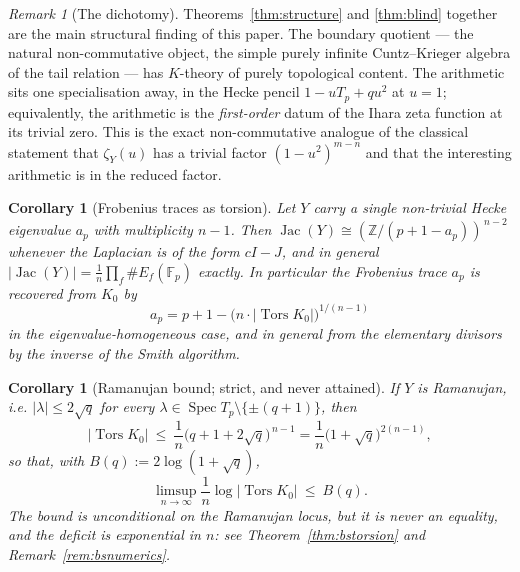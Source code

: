 \documentclass[11pt]{amsart}
\numberwithin{equation}{section}
\newtheorem{corollary}[theorem]{Corollary}
\theoremstyle{definition}
\theoremstyle{remark}
\newtheorem{remark}[theorem]{Remark}
\newcommand{\Z}{\mathbb{Z}}
\newcommand{\F}{\mathbb{F}}
\newcommand{\Tors}{\operatorname{Tors}}
\newcommand{\Jac}{\operatorname{Jac}}
\newcommand{\Spec}{\operatorname{Spec}}
\begin{document}
\begin{remark}[The dichotomy]\label{rem:dichotomy}
Theorems~\ref{thm:structure} and \ref{thm:blind} together are the main structural finding
of this paper. The boundary quotient --- the natural non-commutative object, the simple
purely infinite Cuntz--Krieger algebra of the tail relation --- has $K$-theory of purely
topological content. The arithmetic sits one specialisation away, in the Hecke pencil
$1-uT_p+qu^2$ at $u=1$; equivalently, the arithmetic is the \emph{first-order} datum of
the Ihara zeta function at its trivial zero. This is the exact non-commutative analogue
of the classical statement that $\zeta_Y(u)$ has a trivial factor $(1-u^2)^{m-n}$ and
that the interesting arithmetic is in the reduced factor.
\end{remark}

\begin{corollary}[Frobenius traces as torsion]\label{cor:frobenius}
Let $Y$ carry a single non-trivial Hecke eigenvalue $a_p$ with multiplicity $n-1$. Then
$\Jac(Y)\cong(\Z/(p+1-a_p))^{\,n-2}$ whenever the Laplacian is of the form
$cI-J$, and in general $|\Jac(Y)|=\frac1n\prod_f\#E_f(\F_p)$ exactly. In particular the
Frobenius trace $a_p$ is recovered from $K_0$ by
\[
a_p=p+1-\bigl(n\cdot|\Tors K_0|\bigr)^{1/(n-1)}
\]
in the eigenvalue-homogeneous case, and in general from the elementary divisors by the
inverse of the Smith algorithm.
\end{corollary}

\begin{corollary}[Ramanujan bound; strict, and never attained]\label{cor:ramanujan}
If $Y$ is Ramanujan, i.e. $|\lambda|\le2\sqrt q$ for every
$\lambda\in\Spec T_p\setminus\{\pm(q+1)\}$, then
\[
\bigl|\Tors K_0\bigr|\ \le\ \frac1n\bigl(q+1+2\sqrt q\bigr)^{\,n-1}
=\frac1n\bigl(1+\sqrt q\bigr)^{2(n-1)},
\]
so that, with $B(q):=2\log(1+\sqrt q)$,
\[
\limsup_{n\to\infty}\frac1n\log\bigl|\Tors K_0\bigr|\ \le\ B(q).
\]
The bound is unconditional on the Ramanujan locus, but it is \emph{never} an equality,
and the deficit is exponential in $n$: see Theorem~\ref{thm:bstorsion} and
Remark~\ref{rem:bsnumerics}.
\end{corollary}
\end{document}
